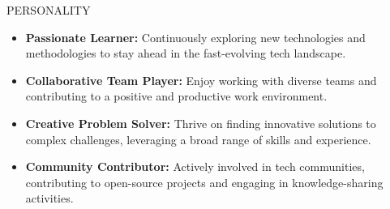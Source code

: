 \documentclass{resume} %
\begin{document}
\begin{rSection}{PERSONALITY}

\begin{itemize}
    \item \textbf{Passionate Learner:} Continuously exploring new technologies and methodologies to stay ahead in the fast-evolving tech landscape.
    \item \textbf{Collaborative Team Player:} Enjoy working with diverse teams and contributing to a positive and productive work environment.
    \item \textbf{Creative Problem Solver:} Thrive on finding innovative solutions to complex challenges, leveraging a broad range of skills and experience.
    \item \textbf{Community Contributor:} Actively involved in tech communities, contributing to open-source projects and engaging in knowledge-sharing activities.
\end{itemize}

\end{rSection}
\end{document}
